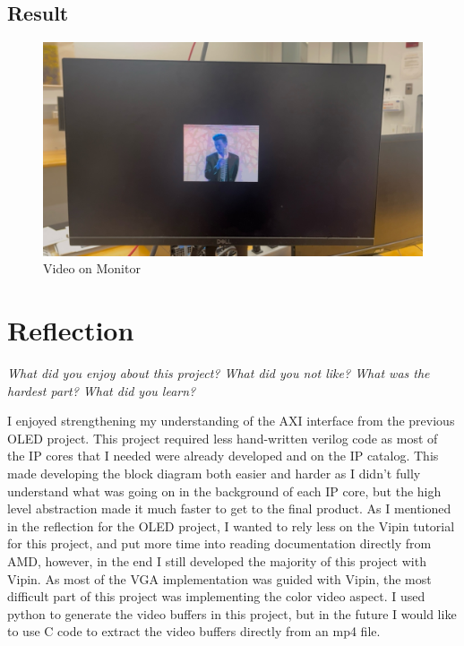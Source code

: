 \documentclass{article}
\begin{document}
\subsection{Result}

\begin{figure}[H]
    \centering
    \includegraphics[width=1\linewidth]{rick_on_monitor.jpeg}
    \caption{Video on Monitor \cite{rick_astley_rick_2009}}
    \label{fig:rick}
\end{figure}

\section{Reflection}

\textit{What did you enjoy about this project?
What did you not like?
What was the hardest part?
What did you learn?}

I enjoyed strengthening my understanding of the AXI interface from the previous OLED project. This project required less hand-written verilog code as most of the IP cores that I needed were already developed and on the IP catalog. This made developing the block diagram both easier and harder as I didn't fully understand what was going on in the background of each IP core, but the high level abstraction made it much faster to get to the final product. As I mentioned in the reflection for the OLED project, I wanted to rely less on the Vipin tutorial for this project, and put more time into reading documentation directly from AMD, however, in the end I still developed the majority of this project with Vipin. As most of the VGA implementation was guided with Vipin, the most difficult part of this project was implementing the color video aspect. I used python to generate the video buffers in this project, but in the future I would like to use C code to extract the video buffers directly from an mp4 file.
\end{document}
